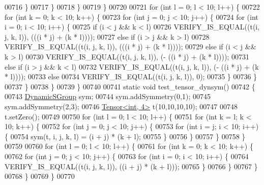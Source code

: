 \begin{DoxyCode}
00716         \}
00717       \}
00718     \}
00719   \}
00720 
00721   \textcolor{keywordflow}{for} (\textcolor{keywordtype}{int} l = 0; l < 10; l++) \{
00722     \textcolor{keywordflow}{for} (\textcolor{keywordtype}{int} k = 0; k < 10; k++) \{
00723       \textcolor{keywordflow}{for} (\textcolor{keywordtype}{int} j = 0; j < 10; j++) \{
00724         \textcolor{keywordflow}{for} (\textcolor{keywordtype}{int} i = 0; i < 10; i++) \{
00725           \textcolor{keywordflow}{if} (i < j && k < l)
00726             VERIFY\_IS\_EQUAL((t(i, j, k, l)), (((i * j) + (k * l))));
00727           \textcolor{keywordflow}{else} \textcolor{keywordflow}{if} (i > j && k > l)
00728             VERIFY\_IS\_EQUAL((t(i, j, k, l)), (((i * j) + (k * l))));
00729           \textcolor{keywordflow}{else} \textcolor{keywordflow}{if} (i < j && k > l)
00730             VERIFY\_IS\_EQUAL((t(i, j, k, l)), (- ((i * j) + (k * l))));
00731           \textcolor{keywordflow}{else} \textcolor{keywordflow}{if} (i > j && k < l)
00732             VERIFY\_IS\_EQUAL((t(i, j, k, l)), (- ((i * j) + (k * l))));
00733           \textcolor{keywordflow}{else}
00734             VERIFY\_IS\_EQUAL((t(i, j, k, l)), 0);
00735         \}
00736       \}
00737     \}
00738   \}
00739 \}
00740 
00741 \textcolor{keyword}{static} \textcolor{keywordtype}{void} test\_tensor\_dynsym()
00742 \{
00743   \hyperlink{class_eigen_1_1_dynamic_s_group}{DynamicSGroup} sym;
00744   sym.addSymmetry(0,1);
00745   sym.addSymmetry(2,3);
00746   \hyperlink{class_eigen_1_1_tensor}{Tensor<int, 4>} t(10,10,10,10);
00747 
00748   t.setZero();
00749 
00750   \textcolor{keywordflow}{for} (\textcolor{keywordtype}{int} l = 0; l < 10; l++) \{
00751     \textcolor{keywordflow}{for} (\textcolor{keywordtype}{int} k = l; k < 10; k++) \{
00752       \textcolor{keywordflow}{for} (\textcolor{keywordtype}{int} j = 0; j < 10; j++) \{
00753         \textcolor{keywordflow}{for} (\textcolor{keywordtype}{int} i = j; i < 10; i++) \{
00754           sym(t, i, j, k, l) = (i + j) * (k + l);
00755         \}
00756       \}
00757     \}
00758   \}
00759 
00760   \textcolor{keywordflow}{for} (\textcolor{keywordtype}{int} l = 0; l < 10; l++) \{
00761     \textcolor{keywordflow}{for} (\textcolor{keywordtype}{int} k = 0; k < 10; k++) \{
00762       \textcolor{keywordflow}{for} (\textcolor{keywordtype}{int} j = 0; j < 10; j++) \{
00763         \textcolor{keywordflow}{for} (\textcolor{keywordtype}{int} i = 0; i < 10; i++) \{
00764           VERIFY\_IS\_EQUAL((t(i, j, k, l)), ((i + j) * (k + l)));
00765         \}
00766       \}
00767     \}
00768   \}
00769 \}
00770 

\end{DoxyCode}
